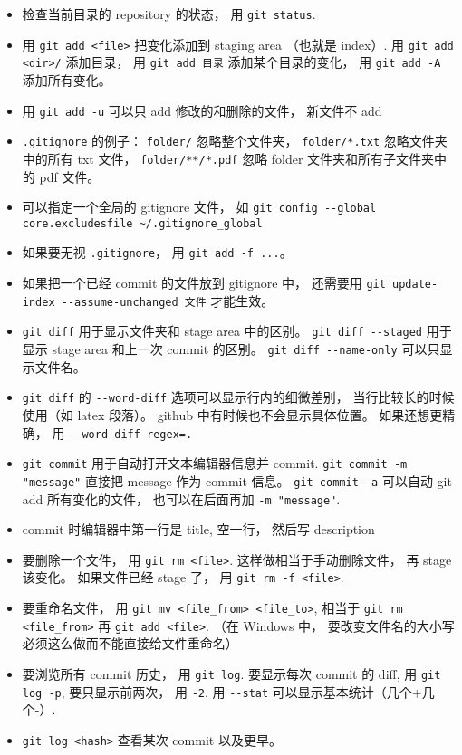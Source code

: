 \begin{itemize}
\item 检查当前目录的 repository 的状态， 用 \verb`git status`. 
\item 用 \verb`git add <file>` 把变化添加到 staging area （也就是 index）. 用 \verb`git add <dir>/` 添加目录， 用 \verb`git add 目录` 添加某个目录的变化， 用 \verb`git add -A` 添加所有变化。
\item 用 \verb`git add -u` 可以只 add 修改的和删除的文件， 新文件不 add
\item \verb`.gitignore` 的例子： \verb`folder/` 忽略整个文件夹， \verb`folder/*.txt` 忽略文件夹中的所有 txt 文件， \verb`folder/**/*.pdf` 忽略 folder 文件夹和所有子文件夹中的 pdf 文件。
\item 可以指定一个全局的 gitignore 文件， 如 \verb`git config --global core.excludesfile ~/.gitignore_global`
\item 如果要无视 \verb`.gitignore`， 用 \verb`git add -f ...`。
\item 如果把一个已经 commit 的文件放到 gitignore 中， 还需要用 \verb`git update-index --assume-unchanged 文件` 才能生效。
\item \verb`git diff` 用于显示文件夹和 stage area 中的区别。 \verb`git diff --staged` 用于显示 stage area 和上一次 commit 的区别。 \verb`git diff --name-only` 可以只显示文件名。
\item \verb`git diff` 的 \verb`--word-diff` 选项可以显示行内的细微差别， 当行比较长的时候使用（如 latex 段落）。 github 中有时候也不会显示具体位置。 如果还想更精确， 用 \verb`--word-diff-regex=.`
\item \verb`git commit` 用于自动打开文本编辑器信息并 commit. \verb`git commit -m "message"` 直接把 message 作为 commit 信息。 \verb`git commit -a` 可以自动 git add 所有变化的文件， 也可以在后面再加 \verb`-m "message"`.
\item commit 时编辑器中第一行是 title, 空一行， 然后写 description
\item 要删除一个文件， 用 \verb`git rm <file>`. 这样做相当于手动删除文件， 再 stage 该变化。 如果文件已经 stage 了， 用 \verb`git rm -f <file>`.
\item 要重命名文件， 用 \verb`git mv <file_from> <file_to>`, 相当于 \verb`git rm <file_from>` 再 \verb`git add <file>`. （在 Windows 中， 要改变文件名的大小写必须这么做而不能直接给文件重命名）
\item 要浏览所有 commit 历史， 用 \verb`git log`. 要显示每次 commit 的 diff, 用 \verb`git log -p`, 要只显示前两次， 用 \verb`-2`. 用 \verb`--stat` 可以显示基本统计（几个+几个-）.
\item \verb`git log <hash>` 查看某次 commit 以及更早。

\end{itemize}
